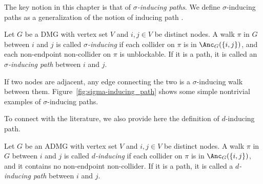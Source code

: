 The key notion in this chapter is that of \emph{$\sigma$-inducing paths}.
We define $\sigma$-inducing paths as a generalization of the notion of inducing path \cite{VermaPearl1990}. %
\begin{Def}\label{def:sigma-inducing_path}
Let $G$ be a DMG with vertex set $V$ and $i,j \in V$ be distinct nodes.
  A walk $\pi$ in $G$ between $i$ and $j$ is called \emph{$\sigma$-inducing} if each
  collider on $\pi$ is in $\Anc_{G}(\{i,j\})$, 
  and each non-endpoint non-collider on $\pi$ is unblockable. 
  If it is a path, it is called an \emph{$\sigma$-inducing path} between $i$ and $j$.
\end{Def}
If two nodes are adjacent, any edge connecting the two is a $\sigma$-inducing walk between them.
Figure~\ref{fig:sigma-inducing_path} shows some simple nontrivial examples of $\sigma$-inducing paths.

To connect with the literature, we also provide here the definition of $d$-inducing path.
\begin{Def}\label{def:d-inducing_path}
Let $G$ be an ADMG with vertex set $V$ and $i,j \in V$ be distinct nodes.
A walk $\pi$ in $G$ between $i$ and $j$ is called \emph{$d$-inducing} if each
  collider on $\pi$ is in $\Anc_{G}(\{i,j\})$,
and it contains no non-endpoint non-collider.
If it is a path, it is called a \emph{$d$-inducing path} between $i$ and $j$.
\end{Def}

